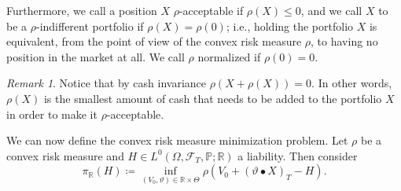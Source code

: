 \documentclass[11pt,a4paper,twoside,openany]{report}
\numberwithin{equation}{section}
\theoremstyle{plain} %
\theoremstyle{definition} %
\theoremstyle{remark} %
\newtheorem{remark}[theorem]{Remark}
\begin{document}
Furthermore, we call a position \(X\) \(\rho\)-acceptable if \(\rho(X)\leq 0\), and we call \(X\) to be a \(\rho\)-indifferent portfolio if \(\rho(X) = \rho(0)\); i.e., holding the portfolio \(X\) is equivalent, from the point of view of the convex risk measure \(\rho\), to having no position in the market at all. We call \(\rho\) normalized if \(\rho(0)=0\).
\begin{remark}\label{rem:minimal amound of injected cash for acceptable position}
    Notice that by cash invariance \(\rho(X+\rho(X))=0\). In other words, \(\rho(X)\) is the smallest amount of cash that needs to be added to the portfolio \(X\) in order to make it \(\rho\)-acceptable.
\end{remark} 

We can now define the convex risk measure minimization problem. Let \(\rho\) be a convex risk measure and \(H\in  L^0(\Omega,\mathcal{F}_T,\mathbb{P};\mathbb{R})\) a liability. Then consider
\begin{equation}\label{eq:risk measure hedging}
    \pi_{\mathbb{R}}(H)\coloneqq\inf_{(V_0,\vartheta)\in\mathbb{R}\times \Theta}\rho(V_0+(\vartheta\bullet X)_T-H).
\end{equation}
\end{document}
